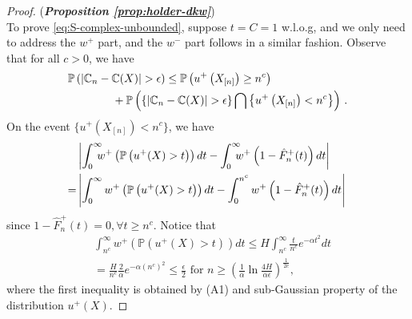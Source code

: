 \begin{proof}(\textbf{\textit{Proposition \ref{prop:holder-dkw}}})\ \\
To prove \eqref{eq:S-complex-unbounded}, suppose $t = C = 1$ w.l.o.g, and we only need to 
address the $w^+$ part, and the $w^-$ part follows in a similar fashion. 
Observe that for all $c > 0$, we have 
\begin{align*}
&\mathbb{P}\left(\left|\mathbb{C}_n -\mathbb{C}(X) \right| > \epsilon \right) \leq \mathbb{P}\left(u^+\left(X_{[n]}\right) \geq n^c \right)\nonumber\\
& \qquad\qquad+ \mathbb{P}\left(\{\left|\mathbb{C}_n -\mathbb{C}(X) \right| > \epsilon\} \bigcap \left\{u^+\left(X_{[n]}\right) < n^c\right\}\right)\,.
\end{align*}
On the event $\{u^+\left(X_{[n]}\right) < n^c\}$, we have
\begin{align*}
&\left|\int_0^{\infty}\!\!\!\! w^+\left(\Prob{u^+(X)>t}\right) dt- \int_0^{\infty} \!\!\!\! w^+\left(1- {\hat F^+_n}(t)\right) dt\right| \\ = &
    \left|\int_0^{\infty} w^+\left(\Prob{u^+(X)>t}\right) dt- \int_0^{n^c} w^+\left(1- {\hat F^+_n}(t)\right) dt\right|\,
\end{align*}
since $1 - \hat F^+_n(t) = 0, \forall t \geq n^c$.  
Notice  that
\begin{align*}
&\int_{n^c}^\infty w^+\left(\mathbb{P} \left( u^+(X) > t \right)\right) dt
\leq H \int_{n^c}^\infty \frac{t}{n^c} e^{-\alpha t^2} dt\\
& = \frac{H}{n^c} \frac{2}{\alpha} e^{-\alpha \left(n^c\right)^2} \leq \frac{\epsilon}{2} \text{ for } n \geq \left(\frac{1}{\alpha} \ln\frac{4H}{\alpha \epsilon} \right)^{\frac{1}{2c}},
\end{align*}
where the first inequality is obtained by (A1) and sub-Gaussian property of the distribution $u^+(X)$. 


\end{proof}
